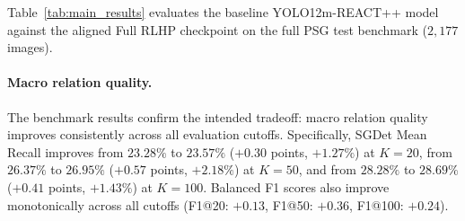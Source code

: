 \documentclass[10pt,twocolumn,letterpaper]{article}
\begin{document}
\begin{table}[t]
\centering
\small
\caption{\textbf{SGDet evaluation on PSG test benchmark ($2,177$ images).} Comparison between the baseline YOLO12m-REACT++ and the Full RLHP model. Values are percentages (\%). Detection bbox mAP remains strictly invariant ($56.57\%$) due to the frozen Stage~1 detector.}
\label{tab:main_results}
\setlength{\tabcolsep}{4.5pt}
\end{table}

Table~\ref{tab:main_results} evaluates the baseline YOLO12m-REACT++ model against the aligned Full RLHP checkpoint on the full PSG test benchmark ($2,177$ images).

\paragraph{Macro relation quality.}
The benchmark results confirm the intended tradeoff: macro relation quality improves consistently across all evaluation cutoffs. Specifically, SGDet Mean Recall improves from $23.28\%$ to $23.57\%$ ($+0.30$ points, $+1.27\%$) at $K=20$, from $26.37\%$ to $26.95\%$ ($+0.57$ points, $+2.18\%$) at $K=50$, and from $28.28\%$ to $28.69\%$ ($+0.41$ points, $+1.43\%$) at $K=100$. Balanced F1 scores also improve monotonically across all cutoffs (F1@20: $+0.13$, F1@50: $+0.36$, F1@100: $+0.24$).
\end{document}
